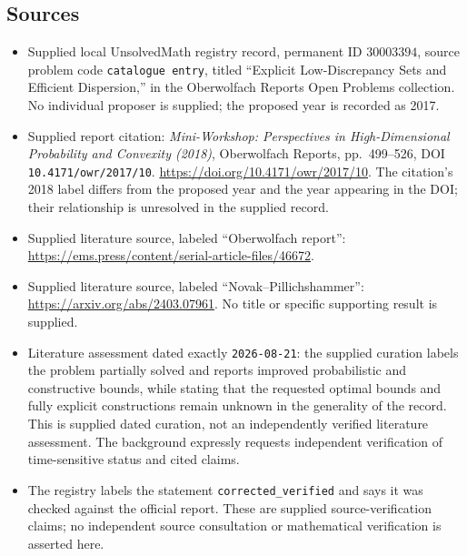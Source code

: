 \documentclass[11pt]{article}
\begin{document}
\subsection{Sources}
\begin{itemize}
\item Supplied local UnsolvedMath registry record, permanent ID \(30003394\), source problem code \texttt{catalogue entry}, titled ``Explicit Low-Discrepancy Sets and Efficient Dispersion,'' in the Oberwolfach Reports Open Problems collection. No individual proposer is supplied; the proposed year is recorded as 2017.
\item Supplied report citation: \emph{Mini-Workshop: Perspectives in High-Dimensional Probability and Convexity (2018)}, Oberwolfach Reports, pp.\ 499--526, DOI \texttt{10.4171/owr/2017/10}. \url{https://doi.org/10.4171/owr/2017/10}. The citation's 2018 label differs from the proposed year and the year appearing in the DOI; their relationship is unresolved in the supplied record.
\item Supplied literature source, labeled ``Oberwolfach report'': \url{https://ems.press/content/serial-article-files/46672}.
\item Supplied literature source, labeled ``Novak--Pillichshammer'': \url{https://arxiv.org/abs/2403.07961}. No title or specific supporting result is supplied.
\item Literature assessment dated exactly \texttt{2026-08-21}: the supplied curation labels the problem partially solved and reports improved probabilistic and constructive bounds, while stating that the requested optimal bounds and fully explicit constructions remain unknown in the generality of the record. This is supplied dated curation, not an independently verified literature assessment. The background expressly requests independent verification of time-sensitive status and cited claims.
\item The registry labels the statement \texttt{corrected\_verified} and says it was checked against the official report. These are supplied source-verification claims; no independent source consultation or mathematical verification is asserted here.
\end{itemize}
\end{document}
